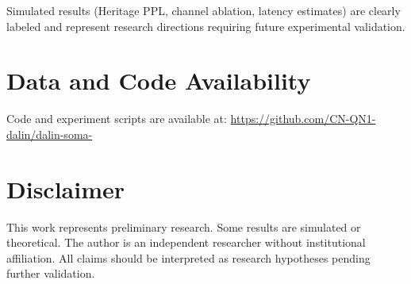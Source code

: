 \documentclass[11pt]{article}
\begin{document}
Simulated results (Heritage PPL, channel ablation, latency estimates) are clearly labeled and represent research directions requiring future experimental validation.

\section*{Data and Code Availability}

Code and experiment scripts are available at: \url{https://github.com/CN-QN1-dalin/dalin-soma-}

\section*{Disclaimer}

This work represents preliminary research. Some results are simulated or theoretical. The author is an independent researcher without institutional affiliation. All claims should be interpreted as research hypotheses pending further validation.
\end{document}
